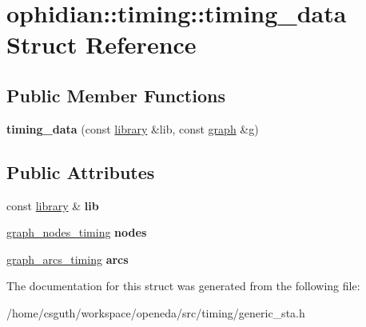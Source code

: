 \hypertarget{structophidian_1_1timing_1_1timing__data}{\section{ophidian\-:\-:timing\-:\-:timing\-\_\-data Struct Reference}
\label{structophidian_1_1timing_1_1timing__data}
}
\subsection*{Public Member Functions}
\begin{DoxyCompactItemize}
\item 
\hypertarget{structophidian_1_1timing_1_1timing__data_aeffd40847afa3242e1e57ae2613f476d}{{\bfseries timing\-\_\-data} (const \hyperlink{classophidian_1_1timing_1_1library}{library} \&lib, const \hyperlink{classophidian_1_1timing_1_1graph}{graph} \&g)}\label{structophidian_1_1timing_1_1timing__data_aeffd40847afa3242e1e57ae2613f476d}

\end{DoxyCompactItemize}
\subsection*{Public Attributes}
\begin{DoxyCompactItemize}
\item 
\hypertarget{structophidian_1_1timing_1_1timing__data_a6567b40b81a54734ad9458fbf4114e2c}{const \hyperlink{classophidian_1_1timing_1_1library}{library} \& {\bfseries lib}}\label{structophidian_1_1timing_1_1timing__data_a6567b40b81a54734ad9458fbf4114e2c}

\item 
\hypertarget{structophidian_1_1timing_1_1timing__data_ad116ea4b6a15a5db0522431d807538cf}{\hyperlink{classophidian_1_1timing_1_1graph__nodes__timing}{graph\-\_\-nodes\-\_\-timing} {\bfseries nodes}}\label{structophidian_1_1timing_1_1timing__data_ad116ea4b6a15a5db0522431d807538cf}

\item 
\hypertarget{structophidian_1_1timing_1_1timing__data_a7bfd3056aaa8382e5a823f3ffbf924c3}{\hyperlink{classophidian_1_1timing_1_1graph__arcs__timing}{graph\-\_\-arcs\-\_\-timing} {\bfseries arcs}}\label{structophidian_1_1timing_1_1timing__data_a7bfd3056aaa8382e5a823f3ffbf924c3}

\end{DoxyCompactItemize}


The documentation for this struct was generated from the following file\-:\begin{DoxyCompactItemize}
\item 
/home/csguth/workspace/openeda/src/timing/generic\-\_\-sta.\-h\end{DoxyCompactItemize}
